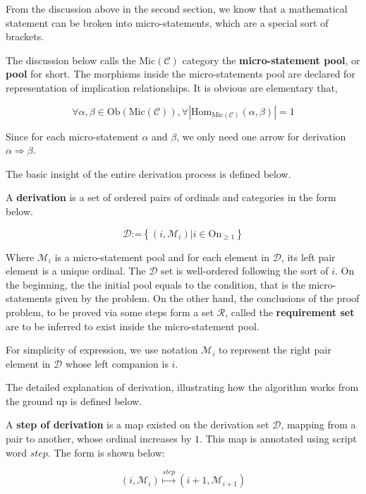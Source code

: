 \documentclass{article}
\begin{document}
From the discussion above in the second section, we know that a mathematical statement can be broken into micro-statements, which are a special sort of brackets.

The discussion below calls the \(\text{Mic}(\mathcal{C})\) category the \textbf{ micro-statement pool}, or \textbf{ pool} for short. The morphisms inside the micro-statements pool are declared for representation of implication relationships. It is obvious are elementary that,

\[\forall \alpha ,\beta \in \text{Ob}(\text{Mic}(\mathcal{C})), \forall \left|\text{Hom}_{\text{Mic}(\mathcal{C})}(\alpha ,\beta )\right|=1\]

Since for each micro-statement \(\alpha\) and \(\beta\), we only need one arrow for derivation \(\alpha \Rightarrow \beta\).

The basic insight of the entire derivation process is defined below.

 A \textbf{ derivation} is a set of ordered pairs of ordinals and categories in the form below. 

\[\mathcal{D}\text{:=}\left\{\left(i,\mathcal{M}_i\right)|i\in \text{On}_{\geq 1}\right\}\]

Where \(\mathcal{M}_i\) { }is a micro-statement pool and for each element in \(\mathcal{D}\), its left pair element is a unique ordinal. The $\mathcal{D}$ set is well-ordered following the sort of \(i\). On the beginning, the the initial pool equals to the condition, that is the micro-statements given by the problem. On the other hand, the conclusions of the proof problem, to be proved via some steps form a set \(\mathcal{R}\), called the \textbf{requirement set} are to be inferred to exist inside the micro-statement pool.

For simplicity of expression, we use notation \(\mathcal{M}_i\) to represent the right pair element in $\mathcal{D}$ { }whose left companion is \(i\).

The detailed explanation of derivation, illustrating how the algorithm works from the ground up is defined below.

 A \textbf{ step of derivation} is a map existed on the derivation set \(\mathcal{D}\), mapping from a pair to another, whose ordinal increases by \(1\). This map is annotated using script word \(\mathit{s}\mathit{t}\mathit{e}\mathit{p}\). The form is shown below:

\[\left(i,\mathcal{M}_i\right)\overset{\mathit{s}\mathit{t}\mathit{e}\mathit{p}}{\mapsto }\left(i+1,\mathcal{M}_{i+1}\right)\]
\end{document}
